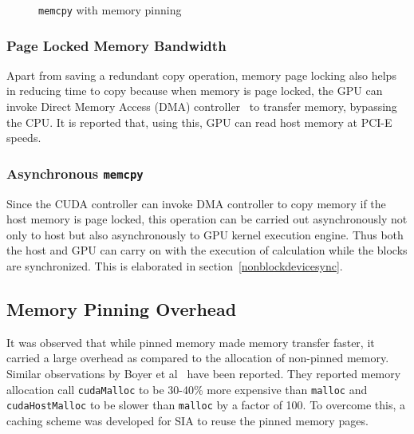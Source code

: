 \begin{figure}[h] %
  \caption{\texttt{memcpy} with memory pinning}\label{fig:w_mem_pin}
\end{figure}

\subsubsection{Page Locked Memory Bandwidth}
Apart from saving a redundant copy operation, memory page locking also helps in
reducing time to copy because when memory is page locked, the GPU can invoke Direct
Memory Access (DMA)
controller~\cite{dmatransfer, whypinnedfast, teslaspecs, teslakspecs}
to transfer memory, bypassing the CPU. It is reported\cite{Kaldewey:2012:GJP:2236584.2236592}
that, using this, GPU can read host memory at PCI-E speeds.

\subsubsection{Asynchronous \texttt{memcpy}}
Since the CUDA controller can invoke DMA controller to copy memory if the host memory
is page locked, this operation can be carried out asynchronously not only to host but
also asynchronously to GPU kernel execution engine. Thus both the host and GPU can carry
on with the execution of calculation while the blocks are synchronized. This is
elaborated in section~\ref{nonblockdevicesync}.

\subsection{Memory Pinning Overhead}
It was observed that while pinned memory made memory transfer faster, it carried
a large overhead as compared to the allocation of non-pinned memory. Similar observations
by Boyer et al~\cite{Boyer2009, memory-management-overhead, pinned-tradeoff}
have been reported. They reported memory allocation call \texttt{cudaMalloc} to
be 30-40\% more expensive than \texttt{malloc} and \texttt{cudaHostMalloc} to be
slower than \texttt{malloc} by a factor of 100. To overcome this, a caching scheme was
developed for SIA to reuse the pinned memory pages.

